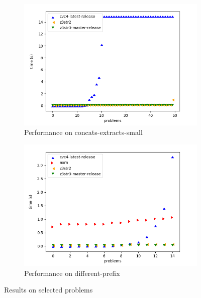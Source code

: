 \begin{figure}[H]
\begin{subfigure}{.5\textwidth}
        \end{subfigure}
        \begin{subfigure}{.5\textwidth}
            \caption{Performance on concats-extracts-small}
            \label{fig:concats-extracts-small}
            \includegraphics[width=\textwidth]{data/graphs/concats-extracts-small.png}
        \end{subfigure}
        \begin{subfigure}{.5\textwidth}
            \caption{Performance on different-prefix}
            \label{fig:different-prefix}
            \includegraphics[width=\textwidth]{data/graphs/different-prefix.png}
        \end{subfigure}
        \caption{Results on selected \fuzzer{} problems}
        \label{fig:graphs}
    \end{figure}


